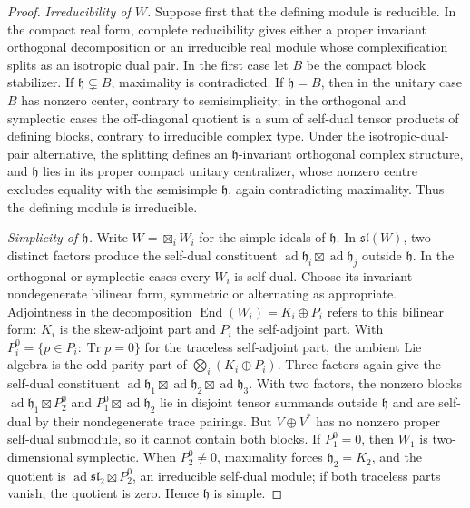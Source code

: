 \documentclass[11pt]{article}
\theoremstyle{remark}
\newcommand{\h}{\mathfrak h}
\begin{document}
\begin{proof}
\emph{Irreducibility of \(W\).}
Suppose first that the defining module is reducible.  In the compact
real form, complete reducibility gives either a proper invariant orthogonal
decomposition or
an irreducible real module whose complexification splits as an isotropic
dual pair.  In the first case let \(B\) be the compact block stabilizer.  If
\(\h\subsetneq B\), maximality is contradicted.  If \(\h=B\), then in the
unitary case \(B\) has nonzero center, contrary to semisimplicity; in the
orthogonal and symplectic cases the off-diagonal quotient is a sum of
self-dual tensor products of defining blocks, contrary to irreducible complex
type.  Under the isotropic-dual-pair alternative, the splitting defines an \(\h\)-invariant
orthogonal complex structure, and \(\h\) lies in its proper compact unitary
centralizer, whose nonzero centre excludes equality with the semisimple
\(\h\), again contradicting maximality. Thus the defining module is
irreducible.

\emph{Simplicity of \(\h\).}
Write \(W=\boxtimes_iW_i\) for the simple ideals of \(\h\). In
\(\mathfrak{sl}(W)\), two distinct factors produce the self-dual constituent
\(\operatorname{ad}\h_i\boxtimes\operatorname{ad}\h_j\) outside \(\h\).
In the orthogonal or symplectic cases every \(W_i\) is self-dual.
Choose its invariant nondegenerate bilinear form, symmetric or alternating
as appropriate. Adjointness in the decomposition
\(\operatorname{End}(W_i)=K_i\oplus P_i\) refers to this bilinear form:
\(K_i\) is the skew-adjoint part and \(P_i\) the self-adjoint part. With \(P_i^0=\{p\in P_i:\operatorname{Tr}p=0\}\) for the traceless
self-adjoint part, the ambient Lie algebra is the odd-parity part of
\(\bigotimes_i(K_i\oplus P_i)\).  Three factors again give the self-dual
constituent
\(\operatorname{ad}\h_1\boxtimes\operatorname{ad}\h_2
 \boxtimes\operatorname{ad}\h_3\).  With two factors, the nonzero blocks
\(\operatorname{ad}\h_1\boxtimes P_2^0\) and
\(P_1^0\boxtimes\operatorname{ad}\h_2\) lie in disjoint tensor summands
outside \(\h\) and are self-dual by their nondegenerate trace pairings.
But \(V\oplus V^*\) has no nonzero proper self-dual submodule, so it cannot
contain both blocks.  If \(P_1^0=0\), then \(W_1\) is two-dimensional
symplectic.  When \(P_2^0\ne0\), maximality forces \(\h_2=K_2\), and the
quotient is \(\operatorname{ad}\mathfrak{sl}_2\boxtimes P_2^0\), an
irreducible self-dual module; if both traceless parts vanish, the quotient is
zero.  Hence \(\h\) is simple.


\end{proof}
\end{document}
